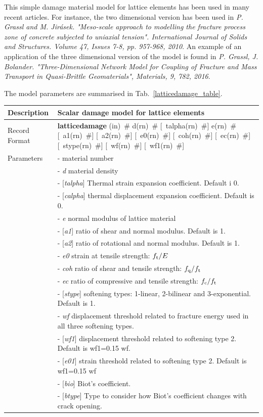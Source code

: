 \documentclass[a4paper]{article}
\newcommand{\descitem}[1]{{\noindent \bf #1}}
\newcommand{\elemparam}[2]{{{#1\tiny (#2)}~\#}}
\newcommand{\optelemparam}[2]{[{~\elemparam{#1}{#2}}]}
\newcommand{\param}[1]{{\it #1}}
\newcommand{\optparam}[1]{[{\it #1}]}
\newenvironment{mmt}{\begin{tabular}{|l|p{9cm}|}}{\end{tabular}\\}
\newenvironment{mmt}{\begin{tabular}{|l|l|}}{\end{tabular}\\}
\begin{document}
This simple damage material model for lattice elements has been used in many recent articles. For instance, the two dimensional version has been used in \textit{P. Grassl and M. Jir\'{a}sek. "Meso-scale approach to modelling the fracture process zone of concrete subjected to uniaxial tension". International Journal of Solids and Structures. Volume 47, Issues 7-8, pp. 957-968, 2010}. An example of an application of the three dimensional version of the model is found in \textit{P. Grassl, J. Bolander. "Three-Dimensional Network Model for Coupling of Fracture and Mass Transport in Quasi-Brittle Geomaterials", Materials, 9, 782, 2016}.  

The model parameters are summarised in Tab.~\ref{latticedamage_table}.
\begin{table}[!htb]
\begin{mmt}
\hline
Description & Scalar damage model for lattice elements \\
\hline
Record Format & \descitem{latticedamage} \elemparam{}{in} 
\elemparam{d}{rn} \optelemparam{talpha}{rn} \elemparam{e}{rn} \optelemparam{a1}{rn} \optelemparam{a2}{rn} \optelemparam{e0}{rn}  \optelemparam{coh}{rn} \optelemparam{ec}{rn} \optelemparam{stype}{rn} \optelemparam{wf}{rn} \optelemparam{wf1}{rn} \\
Parameters &- \param{} material number\\
&- \param{d} material density\\
&- \optparam{talpha} Thermal strain expansion coefficient. Default i 0.\\
&- \optparam{calpha} thermal displacement expansion coefficient. Default is 0.\\
&- \param{e} normal modulus of lattice material\\
&- \optparam{a1} ratio of shear and normal modulus. Default is 1.\\
&- \optparam{a2} ratio of rotational and normal modulus. Default is 1.\\
&- \param{e0} strain at tensile strength: $f_{\rm t}/E$\\
&- \param{coh} ratio of shear and tensile strength: $f_{\rm q}/f_{\rm t}$\\
&- \param{ec} ratio of compressive and tensile strength: $f_{\rm c}/f_{\rm t}$\\
&- \optparam{stype} softening types: 1-linear, 2-bilinear and 3-exponential. Default is 1.\\
&- \param{wf} displacement threshold related to fracture energy used in all three softening types.\\
&- \optparam{wf1} displacement threshold related to softening type 2. Default is wf1=0.15 wf.\\
&- \optparam{e01} strain threshold related to softening type 2. Default is wf1=0.15 wf\\
&- \optparam{bio} Biot's coefficient.\\
&- \optparam{btype} Type to consider how Biot's coefficient changes with crack opening.\\


\end{mmt}
\end{table}
\end{document}
